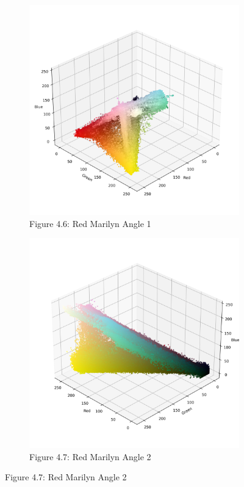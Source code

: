 \documentclass{article}
\begin{document}
\begin{figure}[ht]
  \centering
  \begin{subfigure}{0.45\textwidth}
    \centering
    \includegraphics[width=\textwidth]{main_files/figure-latex/4_5_red_marilyn_original_scatter.jpg}
    \caption{Figure 4.6: Red Marilyn Angle 1}
    \label{fig:4_6_red_marilyn_original_scatter}
  \end{subfigure}
  \hfill
  \begin{subfigure}{0.45\textwidth}
    \centering
    \includegraphics[width=\textwidth]{main_files/figure-latex/4_6_red_marilyn_original_scatter.jpg}
    \caption{Figure 4.7: Red Marilyn Angle 2}
    \label{fig:4_7_red_marilyn_original_scatter}
  \end{subfigure}
  

\end{figure}
\end{document}
